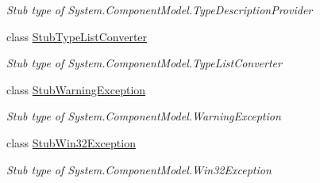 \begin{DoxyCompactItemize}
\begin{DoxyCompactList}\small\item\em Stub type of System.\-Component\-Model.\-Type\-Description\-Provider\end{DoxyCompactList}\item 
class \hyperlink{class_system_1_1_component_model_1_1_fakes_1_1_stub_type_list_converter}{Stub\-Type\-List\-Converter}
\begin{DoxyCompactList}\small\item\em Stub type of System.\-Component\-Model.\-Type\-List\-Converter\end{DoxyCompactList}\item 
class \hyperlink{class_system_1_1_component_model_1_1_fakes_1_1_stub_warning_exception}{Stub\-Warning\-Exception}
\begin{DoxyCompactList}\small\item\em Stub type of System.\-Component\-Model.\-Warning\-Exception\end{DoxyCompactList}\item 
class \hyperlink{class_system_1_1_component_model_1_1_fakes_1_1_stub_win32_exception}{Stub\-Win32\-Exception}
\begin{DoxyCompactList}\small\item\em Stub type of System.\-Component\-Model.\-Win32\-Exception\end{DoxyCompactList}\end{DoxyCompactItemize}
